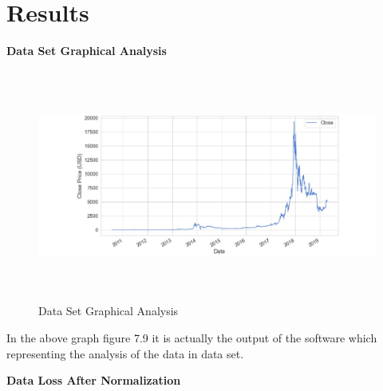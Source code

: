 \documentclass[openany,12pt]{report}
\begin{document}
\section{Results}
\item{\textbf{ Data Set Graphical Analysis}\\

\begin{figure}[H]
\centering
\includegraphics[width=5in,height=3in]{./Data Base.jpeg}
\caption{Data Set Graphical Analysis}
\end{figure}

\newline
In the above graph figure 7.9 it is actually the output of the software which representing the analysis of the data in data set.
\\
\item{\textbf{Data Loss After Normalization}\\

}}
\end{document}
